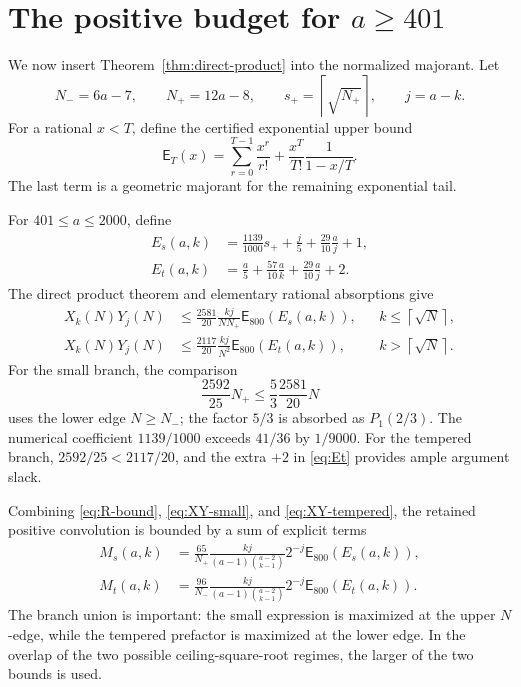 \documentclass[11pt]{article}
\theoremstyle{definition}
\theoremstyle{remark}
\newcommand{\PE}{\mathsf E}
\newcommand{\ceil}[1]{\left\lceil #1\right\rceil}
\begin{document}
\section{The positive budget for \texorpdfstring{$a\ge401$}{a>=401}}
\label{sec:positive}

We now insert Theorem~\ref{thm:direct-product} into the normalized majorant.
Let
\[
  N_-=6a-7,
  \qquad N_+=12a-8,
  \qquad s_+=\ceil{\sqrt{N_+}},
  \qquad j=a-k.
\]
For a rational $x<T$, define the certified exponential upper bound
\begin{equation}\label{eq:PE}
  \PE_T(x)=\sum_{r=0}^{T-1}\frac{x^r}{r!}
       +\frac{x^T}{T!}\frac1{1-x/T}.
\end{equation}
The last term is a geometric majorant for the remaining exponential tail.

For $401\le a\le2000$, define
\begin{align}
 E_s(a,k)&=\frac{1139}{1000}s_++\frac j5+
             \frac{29}{10}\frac aj+1,
 \label{eq:Es}\\
 E_t(a,k)&=\frac a5+\frac{57}{10}\frac ak+
             \frac{29}{10}\frac aj+2.
 \label{eq:Et}
\end{align}
The direct product theorem and elementary rational absorptions give
\begin{align}
 X_k(N)Y_j(N)
 &\le\frac{2581}{20}\frac{kj}{NN_+}\PE_{800}(E_s(a,k)),
 &&k\le\ceil{\sqrt N},
 \label{eq:XY-small}\\
 X_k(N)Y_j(N)
 &\le\frac{2117}{20}\frac{kj}{N^2}\PE_{800}(E_t(a,k)),
 &&k>\ceil{\sqrt N}.
 \label{eq:XY-tempered}
\end{align}
For the small branch, the comparison
\[
 \frac{2592}{25}N_+
 \le\frac53\frac{2581}{20}N
\]
uses the lower edge $N\ge N_-$; the factor $5/3$ is absorbed as
$P_1(2/3)$.  The numerical coefficient
$1139/1000$ exceeds $41/36$ by $1/9000$.  For the tempered branch,
$2592/25<2117/20$, and the extra $+2$ in \eqref{eq:Et} provides ample
argument slack.

Combining \eqref{eq:R-bound}, \eqref{eq:XY-small}, and
\eqref{eq:XY-tempered}, the retained positive convolution is bounded by a
sum of explicit terms
\begin{align}
 M_s(a,k)&=
 \frac{65}{N_+}\frac{kj}{(a-1)\binom{a-2}{k-1}}
 2^{-j}\PE_{800}(E_s(a,k)),
 \label{eq:Ms}\\
 M_t(a,k)&=
 \frac{96}{N_-}\frac{kj}{(a-1)\binom{a-2}{k-1}}
 2^{-j}\PE_{800}(E_t(a,k)).
 \label{eq:Mt}
\end{align}
The branch union is important: the small expression is maximized at the
upper $N$-edge, while the tempered prefactor is maximized at the lower edge.
In the overlap of the two possible ceiling-square-root regimes, the larger
of the two bounds is used.
\end{document}
